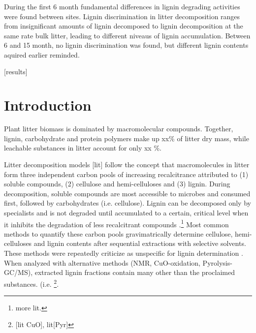 \documentclass[10pt]{article}
\begin{document}
During the first 6 month fundamental differences in lignin degrading activities were found between sites. Lignin discrimination in litter decomposition ranges from insignificant amounts of lignin decomposed to lignin decomposition at the same rate bulk litter, leading to different niveaus of lignin accumulation. Between 6 and 15 month, no lignin discrimination was found, but different lignin contents aquired earlier reminded.

[results]


\linenumbers

\section*{Introduction}
Plant litter biomass is dominated by macromolecular compounds. Together, lignin, carbohydrate and protein polymers make up xx\% of litter dry mass, while leachable substances in litter account for only xx \%. 

Litter decomposition models [lit] follow the concept that macromolecules in litter form three independent carbon pools of increasing recalcitrance attributed to (1) soluble compounds, (2) cellulose and hemi-celluloses and (3) lignin. During decomposition, soluble compounds are most accessible to microbes and consumed first, followed by carbohydrates (i.e. cellulose). Lignin can be decomposed only by specialists and is not degraded until accumulated to a certain, critical level when it inhibits the degradation of less recalcitrant compounds \cite{Berg1980, Couteaux1995, Moorhead2006}.\footnote{more lit.} Most common methods to quantify these carbon pools gravimatrically determine cellulose, hemi-celluloses and lignin contents after sequential extractions with selective solvents. These methods were repeatedly criticize as unspecific for lignin determination \cite{Hatfield2005}. When analyzed with alternative methods (NMR, CuO-oxidation, Pyrolysis-GC/MS), extracted lignin fractions contain many other than the proclaimed substances. (i.e. \cite{Preston1997} \footnote{[lit CuO], lit[Pyr]}. 
\end{document}
